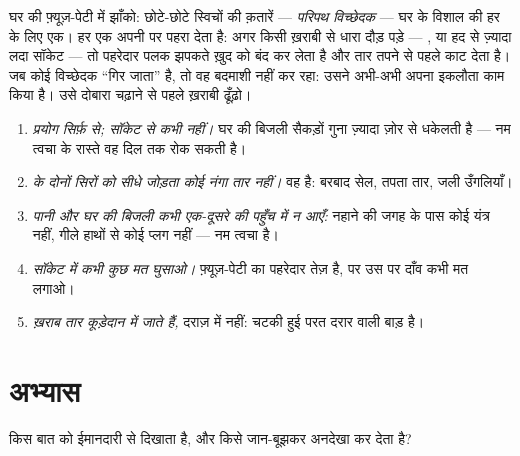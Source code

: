 \begin{remark}[घर के अंगरक्षक]\label{rem:g6:circuits-and-safety:guards}
घर की फ़्यूज़-पेटी में झाँको: छोटे-छोटे स्विचों की क़तारें ---
\emph{परिपथ विच्छेदक} --- घर के विशाल  की हर  के लिए
एक। हर एक अपनी  पर पहरा देता है: अगर किसी ख़राबी से धारा दौड़
पड़े --- , या हद से ज़्यादा लदा सॉकेट --- तो पहरेदार पलक झपकते
ख़ुद को बंद कर लेता है और तार तपने से पहले  काट देता है। जब कोई
विच्छेदक ``गिर जाता'' है, तो वह बदमाशी नहीं कर रहा: उसने अभी-अभी अपना
इकलौता काम किया है। उसे दोबारा चढ़ाने से पहले ख़राबी ढूँढ़ो।
\end{remark}

\begin{remark}[नियम, वजहों सहित]\label{rem:g6:circuits-and-safety:rules}
\begin{enumerate}
  \item \emph{प्रयोग सिर्फ़  से; सॉकेट से कभी नहीं।} घर की
        बिजली सैकड़ों गुना ज़्यादा ज़ोर से धकेलती है --- नम त्वचा के
        रास्ते वह दिल तक रोक सकती है।
  \item \emph{ के दोनों सिरों को सीधे जोड़ता कोई नंगा तार नहीं।} वह  है:
        बरबाद सेल, तपता तार, जली उँगलियाँ।
  \item \emph{पानी और घर की बिजली कभी एक-दूसरे की पहुँच में न आएँ:}
        नहाने की जगह के पास कोई यंत्र नहीं, गीले हाथों से कोई प्लग
        नहीं --- नम त्वचा  है।
  \item \emph{सॉकेट में कभी कुछ मत घुसाओ।} फ़्यूज़-पेटी का पहरेदार
        तेज़ है, पर उस पर दाँव कभी मत लगाओ।
  \item \emph{ख़राब तार कूड़ेदान में जाते हैं,} दराज़ में नहीं: चटकी
        हुई  परत दरार वाली बाड़ है।
\end{enumerate}
\end{remark}

\section{अभ्यास}

\begin{exercise}[$\star$]\label{exo:g6:circuits-and-safety:1}
 किस बात को ईमानदारी से दिखाता है, और किसे जान-बूझकर अनदेखा
कर देता है?
\end{exercise}

